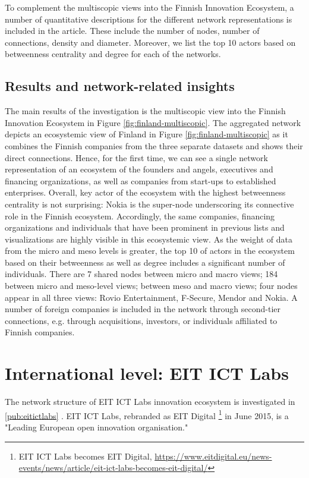 To complement the multiscopic views into the Finnish Innovation Ecosystem, a number of quantitative descriptions for the different network representations is included in the article. These include the number of nodes, number of connections, density and diameter. Moreover, we list the top 10 actors based on betweenness centrality and degree for each of the networks.

\subsection{Results and network-related insights}

The main results of the investigation is the multiscopic view into the Finnish Innovation Ecosystem in Figure \ref{fig:finland-multiscopic}. The aggregated network depicts an ecosystemic view of Finland in Figure \ref{fig:finland-multiscopic} as it combines the Finnish companies from the three separate datasets and shows their direct connections. Hence, for the first time, we can see a single network representation of an ecosystem of the founders and angels, executives and financing organizations, as well as companies from start-ups to established enterprises. Overall, key actor of the ecosystem with the highest betweenness centrality is not surprising: Nokia is the super-node underscoring its connective role in the Finnish ecosystem. Accordingly, the same companies, financing organizations and individuals that have been prominent in previous lists and visualizations are highly visible in this ecosystemic view. As the weight of data from the micro and meso levels is greater, the top 10 of actors in the ecosystem based on their betweenness as well as degree includes a significant number of individuals. There are 7 shared nodes between micro and macro views; 184 between micro and meso-level views; between meso and macro views; four nodes appear in all three views: Rovio Entertainment, F-Secure, Mendor and Nokia. A number of foreign companies is included in the network through second-tier connections, e.g. through acquisitions, investors, or individuals affiliated to Finnish companies.

\section{International level: EIT ICT Labs}

The network structure of EIT ICT Labs innovation ecosystem is investigated in \ref{pub:eitictlabs} \citep{Still2014InsightsVisualisations}. EIT ICT Labs, rebranded as EIT Digital \footnote{EIT ICT Labs becomes EIT Digital, \url{https://www.eitdigital.eu/news-events/news/article/eit-ict-labs-becomes-eit-digital/}} in June 2015, is a "Leading European open innovation organisation." 

